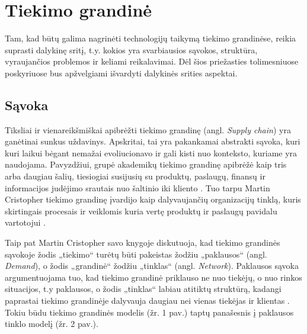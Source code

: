 
\section {Tiekimo grandinė}

Tam, kad būtų galima nagrinėti technologijų taikymą tiekimo grandinėse, reikia suprasti dalykinę sritį, t.y. kokios yra svarbiausios sąvokos, struktūra, vyraujančios problemos ir keliami reikalavimai. Dėl šios priežasties tolimesniuose poskyriuose bus apžvelgiami išvardyti dalykinės srities aspektai.




\subsection{Sąvoka}

Tiksliai ir vienareikšmiškai apibrėžti tiekimo grandinę (angl. \textit{Supply chain}) yra ganėtinai sunkus uždavinys. Apskritai, tai yra pakankamai abstrakti sąvoka, kuri kuri laikui bėgant nemažai evoliucionavo ir gali kisti nuo konteksto, kuriame yra naudojama. Pavyzdžiui, grupė akademikų tiekimo grandinę apibrėžė kaip tris arba daugiau šalių, tiesiogiai susijusių su produktų, paslaugų, finansų ir informacijos judėjimo srautais nuo šaltinio iki kliento \cite{mentzer2001defining}. Tuo tarpu Martin Cristopher tiekimo grandinę įvardijo kaip dalyvaujančių organizacijų tinklą, kuris skirtingais procesais ir veiklomis kuria vertę produktų ir paslaugų pavidalu vartotojui \cite{christopher2016logistics}. 

Taip pat Martin Cristopher savo knygoje diskutuoja, kad tiekimo grandinės sąvokoje žodis „tiekimo“ turėtų būti pakeistas žodžiu „paklausos“ (angl. \textit{Demand}), o žodis „grandinė“ žodžiu „tinklas“ (angl. \textit{Network}). Paklausos sąvoka argumentuojama tuo, kad tiekimo grandinė priklauso ne nuo tiekėjų, o nuo rinkos situacijos, t.y paklausos, o žodis „tinklas“ labiau atitiktų struktūrą, kadangi paprastai tiekimo grandinėje dalyvauja daugiau nei vienas tiekėjas ir klientas \cite{christopher2016logistics}. Tokiu būdu tiekimo grandinės modelis (žr. 1 pav.) taptų panašesnis į paklausos tinklo modelį (žr. 2 pav.).

